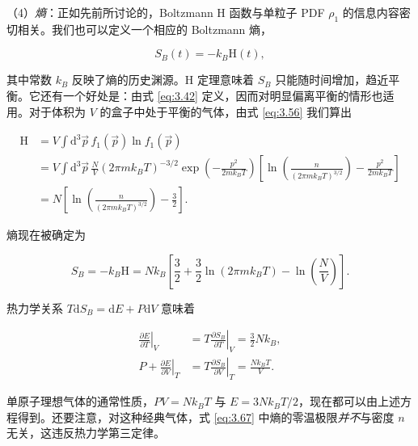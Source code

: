 （4）\emph{熵}：正如先前所讨论的，Boltzmann H 函数与单粒子 PDF $\rho_1$ 的信息内容密切相关。我们也可以定义一个相应的 Boltzmann 熵，

\begin{equation}\label{eq:3.65}
  S_B(t)=-k_B\mathrm{H}(t),
\end{equation}

其中常数 $k_B$ 反映了熵的历史渊源。H 定理意味着 $S_B$ 只能随时间增加，趋近平衡。它还有一个好处是：由式 \eqref{eq:3.42} 定义，因而对明显偏离平衡的情形也适用。对于体积为 $V$ 的盒子中处于平衡的气体，由式 \eqref{eq:3.56} 我们算出

\begin{equation}\label{eq:3.66}
  \begin{aligned}
    \mathrm{H}&=V\int \mathrm{d}^3\vec p\,f_1(\vec p)\ln f_1(\vec p)\\
    &=V\int \mathrm{d}^3\vec p\,\frac{N}{V}\left(2\pi mk_BT\right)^{-3/2}\exp\left(-\frac{p^2}{2mk_BT}\right)\left[\ln\left(\frac{n}{\left(2\pi mk_BT\right)^{3/2}}\right)-\frac{p^2}{2mk_BT}\right]\\
    &=N\left[\ln\left(\frac{n}{\left(2\pi mk_BT\right)^{3/2}}\right)-\frac{3}{2}\right].
  \end{aligned}
\end{equation}

熵现在被确定为

\begin{equation}\label{eq:3.67}
  S_B=-k_B\mathrm{H}=Nk_B\left[\frac{3}{2}+\frac{3}{2}\ln\left(2\pi mk_BT\right)-\ln\left(\frac{N}{V}\right)\right].
\end{equation}

热力学关系 $T\mathrm{d}S_B=\mathrm{d}E+P\mathrm{d}V$ 意味着

\begin{equation}\label{eq:3.68}
  \begin{aligned}
    \left.\frac{\partial E}{\partial T}\right|_V&=T\left.\frac{\partial S_B}{\partial T}\right|_V=\frac{3}{2}Nk_B,\\
    P+\left.\frac{\partial E}{\partial V}\right|_T&=T\left.\frac{\partial S_B}{\partial V}\right|_T=\frac{Nk_BT}{V}.
  \end{aligned}
\end{equation}

单原子理想气体的通常性质，$PV=Nk_BT$ 与 $E=3Nk_BT/2$，现在都可以由上述方程得到。还要注意，对这种经典气体，式 \eqref{eq:3.67} 中熵的零温极限\emph{并不}与密度 $n$ 无关，这违反热力学第三定律。



